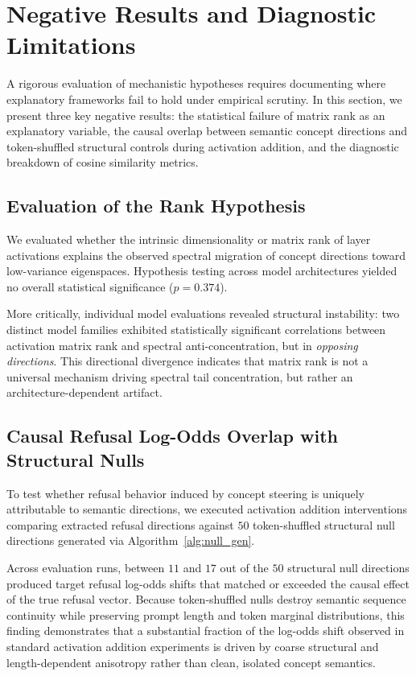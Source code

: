 \section{Negative Results and Diagnostic Limitations}
\label{sec:negative_results}

A rigorous evaluation of mechanistic hypotheses requires documenting where explanatory frameworks fail to hold under empirical scrutiny. In this section, we present three key negative results: the statistical failure of matrix rank as an explanatory variable, the causal overlap between semantic concept directions and token-shuffled structural controls during activation addition, and the diagnostic breakdown of cosine similarity metrics.

\subsection{Evaluation of the Rank Hypothesis}
We evaluated whether the intrinsic dimensionality or matrix rank of layer activations explains the observed spectral migration of concept directions toward low-variance eigenspaces. Hypothesis testing across model architectures yielded no overall statistical significance ($p = 0.374$). 

More critically, individual model evaluations revealed structural instability: two distinct model families exhibited statistically significant correlations between activation matrix rank and spectral anti-concentration, but in \textit{opposing directions}. This directional divergence indicates that matrix rank is not a universal mechanism driving spectral tail concentration, but rather an architecture-dependent artifact.

\subsection{Causal Refusal Log-Odds Overlap with Structural Nulls}
To test whether refusal behavior induced by concept steering is uniquely attributable to semantic directions, we executed activation addition interventions comparing extracted refusal directions against $50$ token-shuffled structural null directions generated via Algorithm~\ref{alg:null_gen}.

Across evaluation runs, between $11$ and $17$ out of the $50$ structural null directions produced target refusal log-odds shifts that matched or exceeded the causal effect of the true refusal vector. Because token-shuffled nulls destroy semantic sequence continuity while preserving prompt length and token marginal distributions, this finding demonstrates that a substantial fraction of the log-odds shift observed in standard activation addition experiments is driven by coarse structural and length-dependent anisotropy rather than clean, isolated concept semantics.

